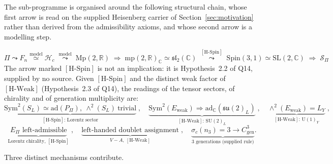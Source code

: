 \documentclass[11pt,a4paper]{article}
\theoremstyle{definition}
\newcommand{\SU}{\mathrm{SU}}
\newcommand{\su}{\mathfrak{su}}
\newcommand{\UU}{\mathrm{U}}
\newcommand{\Mp}{\mathrm{Mp}}
\newcommand{\Spin}{\mathrm{Spin}}
\newcommand{\SL}{\mathrm{SL}}
\newcommand{\Sbundle}{\mathcal{S}_\Pi}
\newcommand{\Epi}{E_\Pi}
\newcommand{\Cgen}{C^3_{\mathrm{gen}}}
\newcommand{\adC}{\mathrm{ad}_\mathbb{C}}
\newcommand{\Ew}{E_{\mathrm{weak}}}
\newcommand{\HSpin}{\ensuremath{[\mathrm{H\text{-}Spin}]}}
\newcommand{\HWeak}{\ensuremath{[\mathrm{H\text{-}Weak}]}}
\begin{document}
    The sub-programme is organised around the following structural chain, whose first arrow is read
    on the supplied Heisenberg carrier of Section~\ref{sec:motivation} rather than derived from the
    admissibility axioms, and whose second arrow is a modelling step.

    \begin{equation}
      \label{eq:chain}
      \Pi \leadsto F_n \overset{\mathrm{model}}{\simeq} \mathcal{H}_c
      \;\overset{\text{model}}{\leadsto}\;
      \Mp(2,\mathbb{R})
      \;\Rightarrow\;
      \mathrm{mp}(2,\mathbb{R})_\mathbb{C} \simeq \mathfrak{sl}_2(\mathbb{C})
      \;\overset{\HSpin}{\leadsto}\;
      \Spin(3,1) \simeq \SL(2,\mathbb{C})
      \;\Rightarrow\;
      \Sbundle
    \end{equation}
    The arrow marked \HSpin{} is not an implication: it is Hypothesis~2.2 of Q14, supplied by no source.
    Given \HSpin{} and the distinct weak factor of \HWeak{} (Hypothesis~2.3 of Q14), the readings of the tensor
    sectors, of chirality and of generation multiplicity are:
    \[
      \underbrace{\mathrm{Sym}^2(S_L) \simeq \mathrm{ad}(P_\Pi),\ \wedge^2(S_L)\ \text{trivial}}
        _{\HSpin\text{: Lorentz sector}}
      \;,\quad
      \underbrace{\mathrm{Sym}^2(\Ew) \Rightarrow \adC(\su(2)_L)}_{\HWeak\text{: }\SU(2)_L}
      \;,\quad
      \underbrace{\wedge^2(\Ew) = L_Y}_{\HWeak\text{: }\UU(1)_Y}
      \;,
    \]
    \[
      \underbrace{\Epi \text{ left-admissible}}_{\text{Lorentz chirality, }\HSpin}
      \;,\quad
      \underbrace{\text{left-handed doublet assignment}}_{V-A,\ \HWeak}
      \;,\quad
      \underbrace{\sigma_c(n_3)=3 \to \Cgen}_{\text{3 generations (supplied rule)}}.
    \]

    Three distinct mechanisms contribute.
\end{document}
